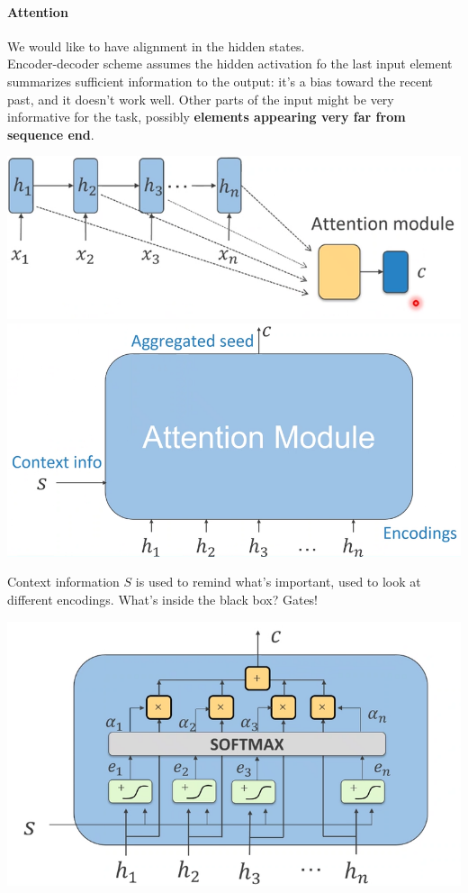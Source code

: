 \documentclass[10pt]{report}
\begin{document}
\paragraph{Attention} We would like to have alignment in the hidden states.\\Encoder-decoder scheme assumes the hidden activation fo the last input element summarizes sufficient information to the output: it's a bias toward the recent past, and it doesn't work well. Other parts of the input might be very informative for the task, possibly \textbf{elements appearing very far from sequence end}.
\begin{center}
	\includegraphics[scale=0.5]{112.png}\\
	\includegraphics[scale=0.33]{113.png}
\end{center}
Context information $S$ is used to remind what's important, used to look at different encodings. What's inside the black box? Gates! 
\begin{center}
	\includegraphics[scale=0.5]{114.png}
\end{center}
\end{document}

